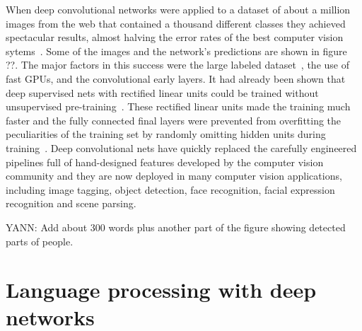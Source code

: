 \documentclass[]{article}
\begin{document}
When deep convolutional networks were applied to a dataset of about a
million images from the web that contained a thousand different classes
they achieved spectacular results, almost halving the error rates of the
best computer vision sytems~\cite{kriz}.  Some of the images and the
network's predictions are shown in figure ??.  The major factors in this
success were the large labeled dataset~\cite{imagenet_cvpr09}, the use of fast GPUs,
and the convolutional early layers.  It had already been shown that deep
supervised nets with rectified linear units could be trained without
unsupervised pre-training~\citep{Glorot+al-AI-2011-small}. 
These rectified linear units made the
training much faster and the fully connected final layers were prevented
from overfitting the peculiarities of the training set by randomly omitting
hidden units during training~\cite{dropoutJMLR}. Deep convolutional nets
have quickly replaced the carefully engineered pipelines full of
hand-designed features developed by the computer vision community and they
are now deployed in many computer vision applications, including image
tagging, object detection, face recognition, facial expression recognition
and scene parsing.

YANN: Add about 300 words plus another part of the figure showing detected
parts of people.

\section{Language processing with deep networks}

\end{document}
